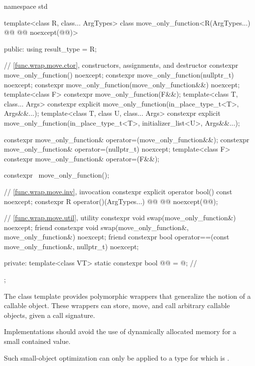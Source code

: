 %
\begin{codeblock}
namespace std {
  template<class R, class... ArgTypes>
  class move_only_function<R(ArgTypes...) @\cv{}@ @@ noexcept(@@)> {
  public:
    using result_type = R;

    // \ref{func.wrap.move.ctor}, constructors, assignments, and destructor
    constexpr move_only_function() noexcept;
    constexpr move_only_function(nullptr_t) noexcept;
    constexpr move_only_function(move_only_function&&) noexcept;
    template<class F> constexpr move_only_function(F&&);
    template<class T, class... Args>
      constexpr explicit move_only_function(in_place_type_t<T>, Args&&...);
    template<class T, class U, class... Args>
      constexpr explicit move_only_function(in_place_type_t<T>, initializer_list<U>, Args&&...);

    constexpr move_only_function& operator=(move_only_function&&);
    constexpr move_only_function& operator=(nullptr_t) noexcept;
    template<class F> constexpr move_only_function& operator=(F&&);

    constexpr ~move_only_function();

    // \ref{func.wrap.move.inv}, invocation
    constexpr explicit operator bool() const noexcept;
    constexpr R operator()(ArgTypes...) @\cv{}@ @@ noexcept(@@);

    // \ref{func.wrap.move.util}, utility
    constexpr void swap(move_only_function&) noexcept;
    friend constexpr void swap(move_only_function&, move_only_function&) noexcept;
    friend constexpr bool operator==(const move_only_function&, nullptr_t) noexcept;

  private:
    template<class VT>
      static constexpr bool @@ = @\seebelow@;       // \expos
  };
}
\end{codeblock}

\pnum
The  class template provides polymorphic wrappers
that generalize the notion of a callable object.
These wrappers can store, move, and call arbitrary callable objects,
given a call signature.

\pnum
\recommended
Implementations should avoid the use of dynamically allocated memory
for a small contained value.
\begin{note}
Such small-object optimization can only be applied to a type 
for which  is .
\end{note}

